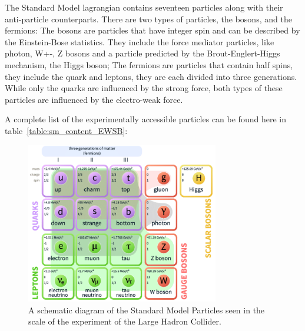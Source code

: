     The Standard Model lagrangian contains seventeen particles along with their anti-particle counterparts. There are two types of particles, the bosons, and the fermions: The bosons are particles that have integer spin and can be described by the Einstein-Bose statistics. They include the force mediator particles, like photon, W+-, Z bosons and a particle predicted by the Brout-Englert-Higgs mechanism, the Higgs boson; The fermions are particles that contain half spins, they include the quark
     and leptons, they are each divided into three generations. While only the quarks are influenced by the strong force, both types of these particles are influenced by the electro-weak force.

     A complete list of the experimentally accessible particles can be found here in table~\ref{table:sm_content_EWSB}:

    \begin{figure}[!htb]
        \begin{center}
            \includegraphics[width=0.75\textwidth]{figures/chapter_SM/SM}
            \caption{
                A schematic diagram of the Standard Model Particles seen in the scale of the experiment of the Large Hadron Collider.
            }
            \label{fig:SM}
        \end{center}
    \end{figure}

